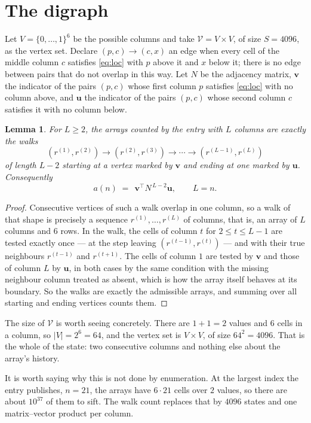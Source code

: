 \documentclass[11pt,a4paper]{article}
\theoremstyle{plain}
\newtheorem{lemma}[theorem]{Lemma}
\theoremstyle{definition}
\begin{document}
\section{The digraph}

Let $V=\{0,\dots,1\}^{6}$ be the possible columns and take
$\mathcal V=V\times V$, of size $S=4096$, as the vertex set. Declare $(p,c)\to(c,x)$ an edge
when every cell of the middle column $c$ satisfies \eqref{eq:loc} with $p$ above it and $x$
below it; there is no edge between pairs that do not overlap in this way. Let $N$ be the
adjacency matrix, $\mathbf{v}$ the indicator of the pairs $(p,c)$ whose first column $p$
satisfies \eqref{eq:loc} with no column above, and $\mathbf{u}$ the indicator of
the pairs $(p,c)$ whose second column $c$ satisfies it with no column below.

\begin{lemma}\label{lem:walk}
For $L\ge2$, the arrays counted by the entry with $L$ columns are exactly the walks
\[
(r^{(1)},r^{(2)})\to(r^{(2)},r^{(3)})\to\cdots\to(r^{(L-1)},r^{(L)})
\]
of length $L-2$ starting at a vertex marked by $\mathbf{v}$ and ending at one marked by
$\mathbf{u}$. Consequently
\[
a(n)\;=\;\,\mathbf{v}^{\!\top}N^{\,L-2}\mathbf{u},\qquad L=n .
\]
\end{lemma}

\begin{proof}
Consecutive vertices of such a walk overlap in one column, so a walk of that shape is
precisely a sequence $r^{(1)},\dots,r^{(L)}$ of columns, that is, an array of $L$ columns
and $6$ rows. In the walk, the cells of column $t$ for $2\le t\le L-1$ are tested
exactly once --- at the step leaving $(r^{(t-1)},r^{(t)})$ --- and with their true
neighbours $r^{(t-1)}$ and $r^{(t+1)}$. The cells of column $1$ are tested by
$\mathbf{v}$ and those of column $L$ by $\mathbf{u}$, in both cases by the same condition
with the missing neighbour column treated as absent, which is how the array itself behaves at
its boundary. So the walks are exactly the admissible arrays, and summing over all starting
and ending vertices counts them.
\end{proof}


The size of $\mathcal V$ is worth seeing concretely. There are $1+1=2$ values
and $6$ cells in a column, so $|V|=2^{6}=64$, and the vertex set is
$V\times V$, of size $64^2=4096$. That is the whole of the state: two consecutive
columns and nothing else about the array's history.

It is worth saying why this is not done by enumeration. At the largest index the entry
publishes, $n=21$, the arrays have $6\cdot21$ cells over
$2$ values, so there are about $10^{37}$ of them to sift. The
walk count replaces that by $4096$ states and one matrix--vector product per column.
\end{document}
